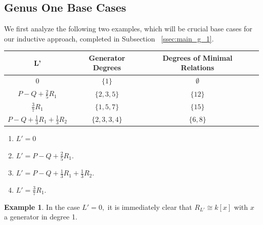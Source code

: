 \documentclass{amsart}
\theoremstyle{plain}
\theoremstyle{definition}
\newtheorem{example}[thm]{Example}
\theoremstyle{remark}
\numberwithin{equation}{section}
\newcommand\ssec{\subsection}
\newcommand \halfcan{L}
\begin{document}
\ssec{Genus One Base Cases}
\label{ssec:g_1_base}

We first analyze the following two examples, which will be crucial base cases for our inductive approach, completed in Subsection ~\ref{ssec:main_g_1}.



\begin{longtable}	{| c || c | c | c |}
	\hline
	L' & Generator Degrees & Degrees of Minimal Relations \\
	\hline
	\hline
	$0$ & $\{1\}$ & $\emptyset$ \\	\hline

	$P-Q + \frac{2}{5}R_1$ & $\{2,3,5\}$ & $\{12\}$ \\	\hline
	
	$\frac{3}{7}R_1$ & $\{1,5,7\}$ & $\{15\}$ \\	\hline

	$P - Q + \frac{1}{3}R_1 + \frac{1}{3}R_2$ & $\{2, 3, 3, 4\}$ & $\{6,8\}$ \\	\hline
	
\end{longtable}
\begin{enumerate}
	\item $\halfcan' = 0$
	\item $\halfcan' = P - Q + \frac{2}{5}R_1.$
	\item $\halfcan' = P - Q + \frac{1}{3}R_1 + \frac{1}{3}R_2.$
	\item $\halfcan' = \frac{3}{7}R_1.$
\end{enumerate}

\begin{example}
\label{eg:base-1-0}
In the case $\halfcan' = 0,$ it is immediately clear that $R_{\halfcan'} \cong k[x]$ with $x$ a generator in degree 1.
\end{example}
\end{document}
